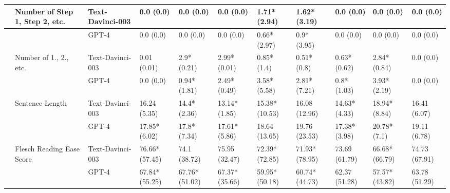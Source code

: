 \begin{tabular}{x{0.75cm}|x{1.5cm}|x{0.75cm}|x{0.75cm}|x{0.75cm}|x{0.75cm}|x{0.75cm}|x{0.75cm}|x{0.75cm}|x{0.75cm}|x{0.75cm}}
\hline
 & Number of Step 1, Step 2, etc. & Text-Davinci-003 & 0.0 (0.0) & 0.0 (0.0) & 0.0 (0.0) & 1.71* (2.94) & 1.62* (3.19) & 0.0 (0.0) & 0.0 (0.0) & 0.0 (0.0) \\
\hline
 &  & GPT-4 & 0.0 (0.0) & 0.0 (0.0) & 0.0 (0.0) & 0.66* (2.97) & 0.9* (3.95) & 0.0 (0.0) & 0.0 (0.0) & 0.0 (0.0) \\
\hline
 & Number of 1., 2., etc. & Text-Davinci-003 & 0.01 (0.01) & 2.9* (0.21) & 2.99* (0.01) & 0.85* (1.4) & 0.51* (0.8) & 0.63* (0.62) & 2.84* (0.84) & 0.0 (0.0) \\
\hline
 &  & GPT-4 & 0.0 (0.0) & 0.94* (1.81) & 2.49* (0.49) & 3.58* (5.58) & 2.81* (7.21) & 0.8* (1.03) & 3.93* (2.19) & 0.0 (0.0) \\
\hline
 & Sentence Length & Text-Davinci-003 & 16.24 (5.35) & 14.4* (2.36) & 13.14* (1.85) & 15.38* (10.53) & 16.08 (12.96) & 14.63* (4.33) & 18.94* (8.84) & 16.41 (6.07) \\
\hline
 &  & GPT-4 & 17.85* (6.02) & 17.8* (7.34) & 17.61* (5.86) & 18.64 (13.65) & 19.76 (23.53) & 17.38* (3.98) & 20.78* (7.1) & 19.11 (6.78) \\
\hline
 & Flesch Reading Ease Score & Text-Davinci-003 & 76.66* (57.45) & 74.1 (38.72) & 75.95 (32.47) & 72.39* (72.85) & 71.93* (78.95) & 73.69 (61.79) & 66.68* (66.79) & 74.73 (67.91) \\
\hline
 &  & GPT-4 & 67.84* (55.25) & 67.76* (51.02) & 67.37* (35.66) & 59.95* (50.18) & 60.74* (44.73) & 62.37 (51.28) & 57.57* (43.82) & 63.78 (51.29) \\
\hline
\bottomrule
\end{tabular}
